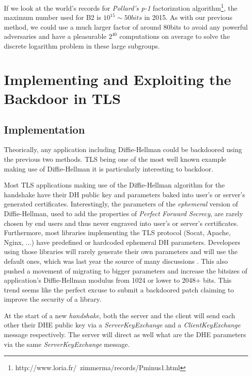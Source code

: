 \documentclass[a4paper,11pt,twocolumn]{article}
\begin{document}
If we look at the world's records for \emph{Pollard's p-1} factorization algorithm\footnote{http://www.loria.fr/~zimmerma/records/Pminus1.html}, the maximum number used for B2 is $10^{15} \sim 50bits$ in 2015. As with our previous method, we could use a much larger factor of around 80bits to avoid any powerful adversaries and have a pleasurable $2^{40}$ computations on average to solve the discrete logarithm problem in these large subgroups.


\section{Implementing and Exploiting the Backdoor in TLS}

\subsection{Implementation}

Theorically, any application including Diffie-Hellman could be backdoored using the previous two methods. TLS being one of the most well known example making use of Diffie-Hellman it is particularly interesting to backdoor.

Most TLS applications making use of the Diffie-Hellman algorithm for the handshake have their DH public key and parameters baked into user's or server's generated certificates. Interestingly, the parameters of the \emph{ephemeral} version of Diffie-Hellman, used to add the properties of \emph{Perfect Forward Secrecy}, are rarely chosen by end users and thus never engraved into user's or server's certificates. Furthermore, most libraries implementing the TLS protocol (Socat, Apache, Nginx, ...) have predefined or hardcoded ephemeral DH parameters. Developers using those libraries will rarely generate their own parameters and will use the default ones, which was last year the source of many discussions . This also pushed a movement of migrating to bigger parameters and increase the bitsizes of application's Diffie-Hellman modulus from 1024 or lower to 2048+ bits. This trend seems like the perfect excuse to submit a backdoored patch claiming to improve the security of a library.

At the start of a new \emph{handshake}, both the server and the client will send each other their DHE public key via a \emph{ServerKeyExchange} and a \emph{ClientKeyExchange} message respectively. The server will direct as well what are the DHE parameters via the same \emph{ServerKeyExchange} message.
\end{document}
